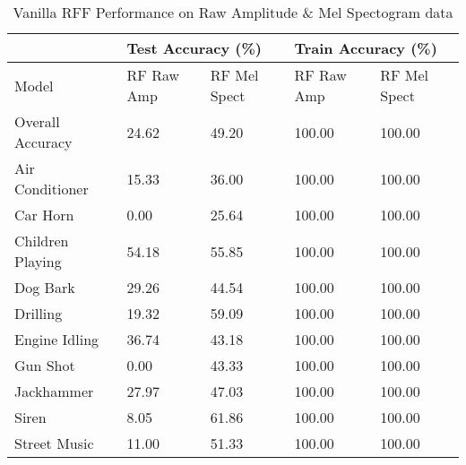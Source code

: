 \documentclass[11pt]{article}
\begin{document}
\begin{table}[h!]
\centering
\begin{tabular}{lllll}
& \multicolumn{2}{l}{Test Accuracy (\%)} & \multicolumn{2}{l}{Train Accuracy (\%)} \\ \toprule
Model            & RF Raw Amp        & RF Mel Spect       & RF Raw Amp        & RF Mel Spect        \\ \toprule
Overall Accuracy & 24.62             & 49.20              & 100.00            & 100.00              \\ \midrule
Air Conditioner  & 15.33             & 36.00              & 100.00            & 100.00              \\
Car Horn         & 0.00              & 25.64              & 100.00            & 100.00              \\
Children Playing & 54.18             & 55.85              & 100.00            & 100.00              \\
Dog Bark         & 29.26             & 44.54              & 100.00            & 100.00              \\
Drilling         & 19.32             & 59.09              & 100.00            & 100.00              \\
Engine Idling    & 36.74             & 43.18              & 100.00            & 100.00              \\
Gun Shot         & 0.00              & 43.33              & 100.00            & 100.00              \\
Jackhammer       & 27.97             & 47.03              & 100.00            & 100.00              \\
Siren            & 8.05              & 61.86              & 100.00            & 100.00              \\
Street Music     & 11.00             & 51.33              & 100.00            & 100.00              \\ \bottomrule
\end{tabular}

\caption{\label{tab:2} Vanilla RFF Performance on Raw Amplitude \& Mel Spectogram data}
\end{table}

\end{document}
